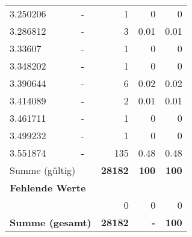 \begin{longtable}{lXrrr}
        3.250206 & \multicolumn{1}{X}{-} & %
          \num{1} &
          \num[round-mode=places,round-precision=2]{0} &
          \num[round-mode=places,round-precision=2]{0} \\

        3.286812 & \multicolumn{1}{X}{-} & %
          \num{3} &
          \num[round-mode=places,round-precision=2]{0,01} &
          \num[round-mode=places,round-precision=2]{0,01} \\

        3.33607 & \multicolumn{1}{X}{-} & %
          \num{1} &
          \num[round-mode=places,round-precision=2]{0} &
          \num[round-mode=places,round-precision=2]{0} \\

        3.348202 & \multicolumn{1}{X}{-} & %
          \num{1} &
          \num[round-mode=places,round-precision=2]{0} &
          \num[round-mode=places,round-precision=2]{0} \\

        3.390644 & \multicolumn{1}{X}{-} & %
          \num{6} &
          \num[round-mode=places,round-precision=2]{0,02} &
          \num[round-mode=places,round-precision=2]{0,02} \\

        3.414089 & \multicolumn{1}{X}{-} & %
          \num{2} &
          \num[round-mode=places,round-precision=2]{0,01} &
          \num[round-mode=places,round-precision=2]{0,01} \\

        3.461711 & \multicolumn{1}{X}{-} & %
          \num{1} &
          \num[round-mode=places,round-precision=2]{0} &
          \num[round-mode=places,round-precision=2]{0} \\

        3.499232 & \multicolumn{1}{X}{-} & %
          \num{1} &
          \num[round-mode=places,round-precision=2]{0} &
          \num[round-mode=places,round-precision=2]{0} \\

        3.551874 & \multicolumn{1}{X}{-} & %
          \num{135} &
          \num[round-mode=places,round-precision=2]{0,48} &
          \num[round-mode=places,round-precision=2]{0,48} \\

     \midrule
     \multicolumn{2}{l}{Summe (gültig)} &
       \textbf{\num{28182}} &
     \textbf{100} &
       \textbf{\num[round-mode=places,round-precision=2]{100}} \\
     \multicolumn{5}{l}{\textbf{Fehlende Werte}}\\
      & & 0 & 0 & 0 \\
     \midrule
     \multicolumn{2}{l}{\textbf{Summe (gesamt)}} &
          \textbf{\num{28182}} &
        \textbf{-} &
        \textbf{100} \\
     \bottomrule
     \end{longtable}
     
